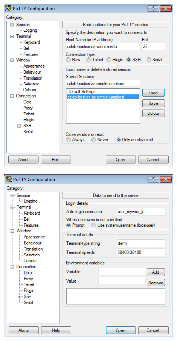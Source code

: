 \documentclass[12pt]{article}
\begin{document}
\begin{flushleft}
\begin{enumerate}
\begin{figure}[bh!]
\centering
\begin{subfigure}{.5\textwidth}
  \centering
  \includegraphics[width=.9\linewidth]{putty_cslab_bastion_session}
  \label{fig:sub1}
\end{subfigure}
\begin{subfigure}{.5\textwidth}
  \centering
  \includegraphics[width=.9\linewidth]{putty_cslab_auto_login_username}

\end{subfigure}
\end{figure}
\end{enumerate}
\end{flushleft}
\end{document}
